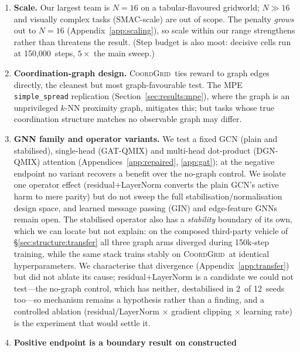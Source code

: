 \documentclass[10pt]{article}
\newcommand{\algoname}[1]{\textsc{#1}}
\newcommand{\coordgrid}{\textsc{CoordGrid}}
\newcommand{\gatqmix}{\algoname{GAT-QMIX}}
\newcommand{\dgnqmix}{\algoname{DGN-QMIX}}
\newcommand{\PEsteps}{150{,}000}      %
\newcommand{\PDseeds}{12}
\newcommand{\PDblowMlp}{2}
\begin{document}
\begin{enumerate}[leftmargin=*,itemsep=0pt,topsep=2pt]
  \item \textbf{Scale.} Our largest team is $N{=}16$ on a tabular-flavoured
        gridworld; $N{\gg}16$ and visually complex tasks (SMAC-scale) are
        out of scope. The penalty \emph{grows} out to $N{=}16$
        (Appendix~\ref{app:scaling}), so scale within our range strengthens
        rather than threatens the result. (Step budget is also moot:
        decisive cells run at \PEsteps\ steps, $5\times$ the main sweep.)
  \item \textbf{Coordination-graph design.} \coordgrid\ ties reward to
        graph edges directly, the cleanest but most graph-favourable
        test. The MPE \texttt{simple\_spread} replication
        (Section~\ref{sec:results:mpe}), where the graph is an unprivileged
        $k$-NN proximity graph, mitigates this; but tasks whose true
        coordination structure matches no observable graph may differ.
  \item \textbf{GNN family and operator variants.} We test a fixed
        GCN (plain and stabilised), single-head (\gatqmix) and multi-head
        dot-product (\dgnqmix) attention (Appendices~\ref{app:repaired},
        \ref{app:gat}); at the negative endpoint no variant recovers a
        benefit over the no-graph control. We isolate one operator effect
        (residual$+$LayerNorm converts the plain GCN's active harm to mere
        parity) but do not sweep the full stabilisation/normalisation design
        space, and learned message passing (\algoname{GIN}) and edge-feature
        GNNs remain open. The stabilised operator also has a \emph{stability}
        boundary of its own, which we can locate but not explain: on the
        composed third-party vehicle of \S\ref{sec:structure:transfer} all
        three graph arms diverged during 150k-step training, while the same
        stack trains stably on \coordgrid\ at identical hyperparameters. We
        characterise that divergence (Appendix~\ref{app:transfer}) but did not
        ablate its cause; residual$+$LayerNorm is a candidate we could not
        test---the no-graph control, which has neither, destabilised in
        \PDblowMlp\ of \PDseeds\ seeds too---so mechanism remains a hypothesis
        rather than a finding, and a controlled ablation (residual/LayerNorm
        $\times$ gradient clipping $\times$ learning rate) is the experiment
        that would settle it.
  \item \textbf{Positive endpoint is a boundary result on constructed
}
\end{enumerate}
\end{document}
